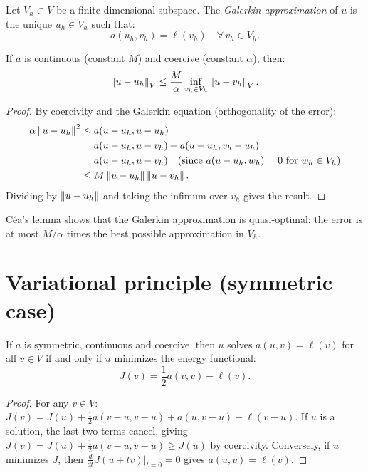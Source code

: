 \begin{definition}
Let $V_h \subset V$ be a finite-dimensional subspace. The \emph{Galerkin
approximation} of $u$ is the unique $u_h \in V_h$ such that:
\[
    a(u_h, v_h) = \ell(v_h) \quad \forall\, v_h \in V_h.
\]
\end{definition}

\begin{theorem}[C\'ea's lemma]
\label{thm:cea}
If $a$ is continuous (constant $M$) and coercive (constant $\alpha$), then:
\[
    \left\| u - u_h \right\|_V \leq \frac{M}{\alpha} \inf_{v_h \in V_h} \left\| u - v_h \right\|_V.
\]
\end{theorem}

\begin{proof}
By coercivity and the Galerkin equation (orthogonality of the error):
\begin{align*}
    \alpha\left\| u - u_h \right\|^2 &\leq a(u - u_h, u - u_h) \\
    &= a(u - u_h, u - v_h) + a(u - u_h, v_h - u_h) \\
    &= a(u - u_h, u - v_h) \quad \text{(since $a(u - u_h, w_h) = 0$ for $w_h \in V_h$)} \\
    &\leq M\left\| u - u_h \right\|\left\| u - v_h \right\|.
\end{align*}
Dividing by $\left\| u - u_h \right\|$ and taking the infimum over $v_h$ gives the result.
\end{proof}

\begin{remark}
C\'ea's lemma shows that the Galerkin approximation is quasi-optimal: the error
is at most $M/\alpha$ times the best possible approximation in $V_h$.
\end{remark}

\section{Variational principle (symmetric case)}

\begin{theorem}
\label{thm:variational_equivalence}
If $a$ is symmetric, continuous and coercive, then $u$ solves $a(u,v) = \ell(v)$
for all $v \in V$ if and only if $u$ minimizes the energy functional:
\[
    J(v) = \frac{1}{2} a(v, v) - \ell(v).
\]
\end{theorem}

\begin{proof}
For any $v \in V$:
$J(v) = J(u) + \frac{1}{2}a(v - u, v - u) + a(u, v - u) - \ell(v - u)$.
If $u$ is a solution, the last two terms cancel, giving
$J(v) = J(u) + \frac{1}{2}a(v-u, v-u) \geq J(u)$ by coercivity.
Conversely, if $u$ minimizes $J$, then $\frac{d}{dt}J(u + tv)|_{t=0} = 0$
gives $a(u,v) = \ell(v)$.
\end{proof}

